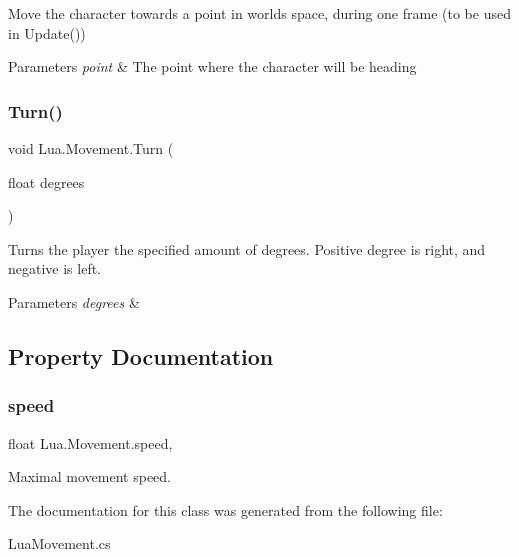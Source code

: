 Move the character towards a point in worlds space, during one frame (to be used in Update()) 


\begin{DoxyParams}{Parameters}
{\em point} & The point where the character will be heading\\
\hline
\end{DoxyParams}
\mbox{\label{class_lua_1_1_movement_a26e7ee9591b48c6ddf74becf73ebe078}} 
\subsubsection{\texorpdfstring{Turn()}{Turn()}}
{\footnotesize\ttfamily void Lua.\+Movement.\+Turn (\begin{DoxyParamCaption}\item[{float}]{degrees }\end{DoxyParamCaption})}



Turns the player the specified amount of degrees. Positive degree is right, and negative is left. 


\begin{DoxyParams}{Parameters}
{\em degrees} & \\
\hline
\end{DoxyParams}


\subsection{Property Documentation}
\mbox{\label{class_lua_1_1_movement_a72e61b8d3a308361d8bb6d80367af2df}} 
\subsubsection{\texorpdfstring{speed}{speed}}
{\footnotesize\ttfamily float Lua.\+Movement.\+speed\hspace{0.3cm}{\ttfamily [get]}, {\ttfamily [set]}}



Maximal movement speed. 



The documentation for this class was generated from the following file\+:\begin{DoxyCompactItemize}
\item 
Lua\+Movement.\+cs\end{DoxyCompactItemize}
